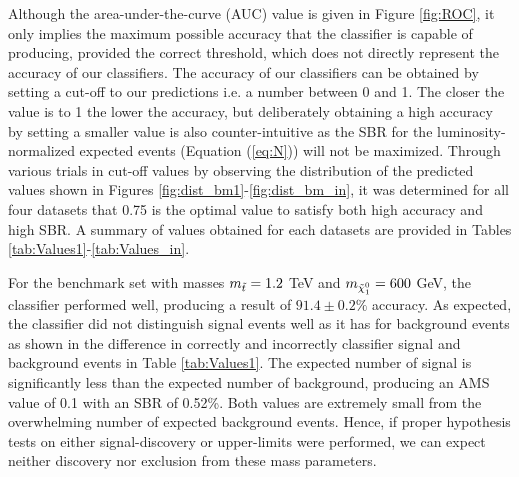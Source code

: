 Although the area-under-the-curve (AUC) value is given in Figure \ref{fig:ROC}, it only implies the maximum possible accuracy that the classifier is capable of producing, provided the correct threshold, which does not directly represent the accuracy of our classifiers. The accuracy of our classifiers can be obtained by setting a cut-off to our predictions i.e. a number between 0 and 1. The closer the value is to 1 the lower the accuracy, but deliberately obtaining a high accuracy by setting a smaller value is also counter-intuitive as the SBR for the luminosity-normalized expected events (Equation (\ref{eq:N})) will not be maximized. Through various trials in cut-off values by observing the distribution of the predicted values shown in Figures \ref{fig:dist_bm1}-\ref{fig:dist_bm_in}, it was determined for all four datasets that 0.75 is the optimal value to satisfy both high accuracy and high SBR. A summary of values obtained for each datasets are provided in Tables \ref{tab:Values1}-\ref{tab:Values_in}. 

For the benchmark set with masses $m_{\Tilde{t}} = 1.2$ TeV and $m_{\Tilde{\chi}_1^0} = 600$ GeV, the classifier performed well, producing a result of $91.4 \pm 0.2 \%$ accuracy. As expected, the classifier did not distinguish signal events well as it has for background events as shown in the difference in correctly and incorrectly classifier signal and background events in Table \ref{tab:Values1}. The expected number of signal is significantly less than the expected number of background, producing an AMS value of 0.1 with an SBR of 0.52\%. Both values are extremely small from the overwhelming number of expected background events. Hence, if proper hypothesis tests on either signal-discovery or upper-limits were performed, we can expect neither discovery nor exclusion from these mass parameters. \\

